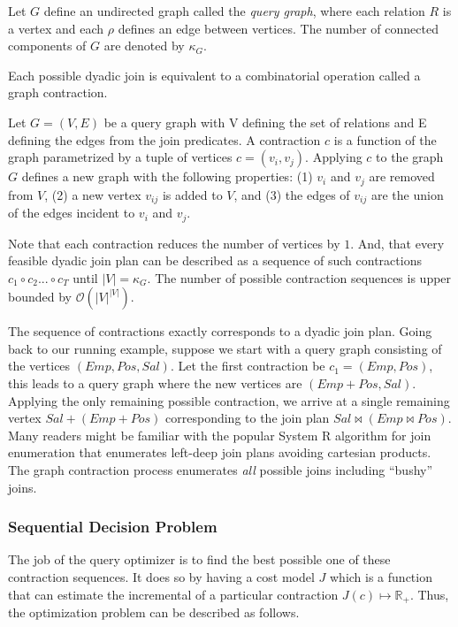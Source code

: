 \begin{definition}
Let $G$ define an undirected graph called the \emph{query graph}, where each relation $R$ is a vertex and each $\rho$ defines an edge between vertices. The number of connected components of $G$ are denoted by $\kappa_G$.
\end{definition}

Each possible dyadic join is equivalent to a combinatorial operation called a graph contraction.

\begin{definition}[Contraction]
Let $G = (V,E)$ be a query graph with V defining the set of relations and E defining the edges from the join predicates. A contraction $c$ is a function of the graph parametrized by a tuple of vertices $c=(v_i, v_j)$. Applying $c$ to the graph $G$ defines a new graph with the following properties: (1) $v_i$ and $v_j$ are removed from $V$, (2) a new vertex $v_{ij}$ is added to $V$, and (3) the edges of $v_{ij}$ are the union of the edges incident to $v_i$ and $v_j$. 
\end{definition}

Note that each contraction reduces the number of vertices by $1$. And, that every feasible dyadic join plan can be described as a sequence of such contractions $c_1 \circ c_2 ...\circ c_{T}$ until $|V| = \kappa_G$. The number of possible contraction sequences is upper bounded by $\mathcal{O}(|V|^{|V|})$. 

The sequence of contractions exactly corresponds to a dyadic join plan. Going back to our running example, suppose we start with a query graph consisting of the vertices $(Emp, Pos, Sal)$. Let the first contraction be $c_1 = (Emp, Pos)$, this leads to a query graph where the new vertices are $(Emp+Pos, Sal)$. Applying the only remaining possible contraction, we arrive at a single remaining vertex $Sal+(Emp+Pos)$ corresponding to the join plan $Sal \bowtie (Emp \bowtie Pos)$. Many readers might be familiar with the popular System R algorithm for join enumeration that enumerates left-deep join plans avoiding cartesian products. The graph contraction process enumerates \emph{all} possible joins including ``bushy'' joins.

\subsubsection{Sequential Decision Problem}
The job of the query optimizer is to find the best possible one of these contraction sequences. It does so by having a cost model $J$ which is a function that can estimate the incremental of a particular contraction $J(c) \mapsto \mathbb{R}_+$. Thus, the optimization problem can be described as follows.

